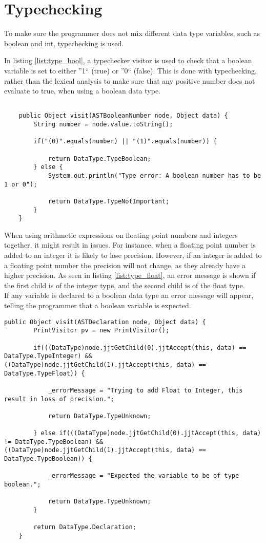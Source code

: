 \section{Typechecking}
To make sure the programmer does not mix different data type variables, such as boolean and int, typechecking is used.

In listing \ref{list:type_bool}, a typechecker visitor is used to check that a boolean variable is set to either ''1`` (true) or ''0`` (false). This is done with typechecking, rather than the lexical analysis to make sure that any positive number does not evaluate to true, when using a boolean data type.
\pagebreak
\begin{lstlisting}[caption=Verifies/falsifies whether a boolean variable is 0 or 1, label=list:type_bool]

    public Object visit(ASTBooleanNumber node, Object data) {
    	String number = node.value.toString();

		if("(0)".equals(number) || "(1)".equals(number)) {
			
			return DataType.TypeBoolean;
		} else {
			System.out.println("Type error: A boolean number has to be 1 or 0");
			
			return DataType.TypeNotImportant;
		}	 
    }
\end{lstlisting}

When using arithmetic expressions on floating point numbers and integers together, it might result in issues. For instance, when a floating point number is added to an integer it is likely to lose precision. However, if an integer is added to a floating point number the precision will not change, as they already have a higher precision. As seen in listing \ref{list:type_float}, an error message is shown if the first child is of the integer type, and the second child is of the float type. \\
If any variable is declared to a boolean data type an error message will appear, telling the programmer that a boolean variable is expected.

\begin{lstlisting}[caption=Checks if float is being added to an integer\, and if a non-boolean type is set to a boolean value, label=list:type_float]
	public Object visit(ASTDeclaration node, Object data) {
		PrintVisitor pv = new PrintVisitor();

		if(((DataType)node.jjtGetChild(0).jjtAccept(this, data) == DataType.TypeInteger) && ((DataType)node.jjtGetChild(1).jjtAccept(this, data) == DataType.TypeFloat)) {

			_errorMessage = "Trying to add Float to Integer, this result in loss of precision.";

			return DataType.TypeUnknown;

		} else if(((DataType)node.jjtGetChild(0).jjtAccept(this, data) != DataType.TypeBoolean) && ((DataType)node.jjtGetChild(1).jjtAccept(this, data) == DataType.TypeBoolean)) {

			_errorMessage = "Expected the variable to be of type boolean.";

			return DataType.TypeUnknown;
		}

		return DataType.Declaration;
	}
\end{lstlisting}

